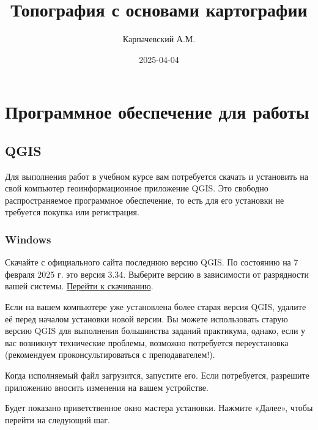 \documentclass[
  12pt,
]{book}
\title{Топография с основами картографии}
\author{Карпачевский А.М.}
\date{2025-04-04}
\begin{document}
\maketitle

{
\hypersetup{linkcolor=}
\setcounter{tocdepth}{1}
\tableofcontents
}
\chapter*{Программное обеспечение для работы}\label{ux43fux440ux43eux433ux440ux430ux43cux43cux43dux43eux435-ux43eux431ux435ux441ux43fux435ux447ux435ux43dux438ux435-ux434ux43bux44f-ux440ux430ux431ux43eux442ux44b}

\section*{QGIS}\label{qgis}

Для выполнения работ в учебном курсе вам потребуется скачать и установить на свой компьютер геоинформационное приложение QGIS. Это свободно распространяемое программное обеспечение, то есть для его установки не требуется покупка или регистрация.

\subsection*{Windows}\label{windows}

Скачайте с официального сайта последнюю версию QGIS. По состоянию на 7 февраля 2025 г. это версия 3.34. Выберите версию в зависимости от разрядности вашей системы. \href{https://download.osgeo.org/qgis/windows/QGIS-OSGeo4W-3.34.15-1.msi}{Перейти к скачиванию}.

Если на вашем компьютере уже установлена более старая версия QGIS, удалите её перед началом установки новой версии. Вы можете использовать старую версию QGIS для выполнения большинства заданий практикума, однако, если у вас возникнут технические проблемы, возможно потребуется переустановка (рекомендуем проконсультироваться с преподавателем!).

Когда исполняемый файл загрузится, запустите его. Если потребуется, разрешите приложению вносить изменения на вашем устройстве.

Будет показано приветственное окно мастера установки. Нажмите «Далее», чтобы перейти на следующий шаг.
\end{document}
